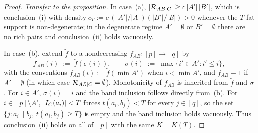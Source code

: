 \begin{proof}
\smallskip
\noindent\emph{Transfer to the proposition.}
In case~(a), $|\mathcal{R}_{AB\mid C}|\ge c\,|A'|\,|B'|$, which is conclusion~(i)
with density $c_T:=c\,(|A'|/|A|)(|B'|/|B|)>0$ whenever the $T$-fat support is
non-degenerate; in the degenerate regime $A'=\emptyset$ or $B'=\emptyset$
there are no rich pairs and conclusion~(ii) holds vacuously.

In case~(b), extend $\tilde f$ to a nondecreasing $f_{AB}:[p]\to[q]$ by
\[
  f_{AB}(i)\;:=\;\tilde f(\sigma(i)),\qquad
  \sigma(i)\;:=\;\max\{i'\in A':i'\le i\},
\]
with the conventions $f_{AB}(i):=\tilde f(\min A')$ when $i<\min A'$, and
$f_{AB}\equiv 1$ if $A'=\emptyset$ (in which case $\mathcal{R}_{AB\mid C}=\emptyset$).
Monotonicity of $f_{AB}$ is inherited from $\tilde f$ and $\sigma$. For
$i\in A'$, $\sigma(i)=i$ and the band inclusion follows directly from~(b).
For $i\in[p]\setminus A'$, $|I_C(a_i)|<T$ forces $t(a_i,b_j)<T$ for every
$j\in[q]$, so the set $\{j:a_i\parallel b_j,\,t(a_i,b_j)\ge T\}$ is empty and
the band inclusion holds vacuously. Thus conclusion~(ii) holds on all of
$[p]$ with the same $K=K(T)$.
\end{proof}

